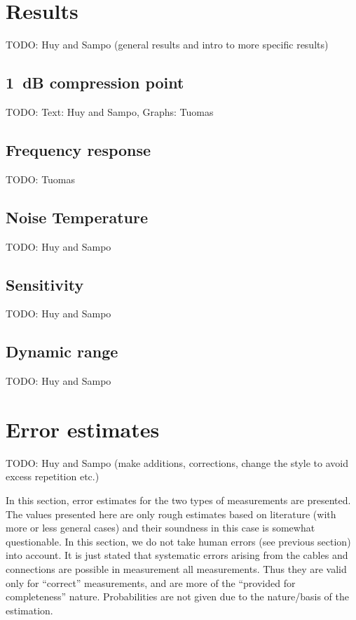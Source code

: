 \documentclass[a4paper, 12pt]{article}
\begin{document}
\newpage
\section{Results}

TODO: Huy and Sampo (general results and intro to more specific results)


\subsection{1~dB compression point}

TODO: Text: Huy and Sampo, Graphs: Tuomas


\subsection{Frequency response}

TODO: Tuomas


\subsection{Noise Temperature}

TODO: Huy and Sampo


\subsection{Sensitivity}

TODO: Huy and Sampo


\subsection{Dynamic range}

TODO: Huy and Sampo


\newpage
\section{Error estimates}

TODO: Huy and Sampo (make additions, corrections, change the style to avoid excess 
repetition etc.)

In this section, error estimates for the two types of measurements are presented.
The values presented here are only rough estimates based on literature (with more 
or less general cases) and their soundness in this case is somewhat questionable. 
In this section, we do not take human errors (see previous section) into account. 
It is just stated that systematic errors arising from the cables and connections 
are possible in measurement all measurements. Thus they are valid only for 
``correct'' measurements, and are more of the ``provided for completeness'' 
nature. Probabilities are not given due to the nature/basis of the estimation.
\end{document}
